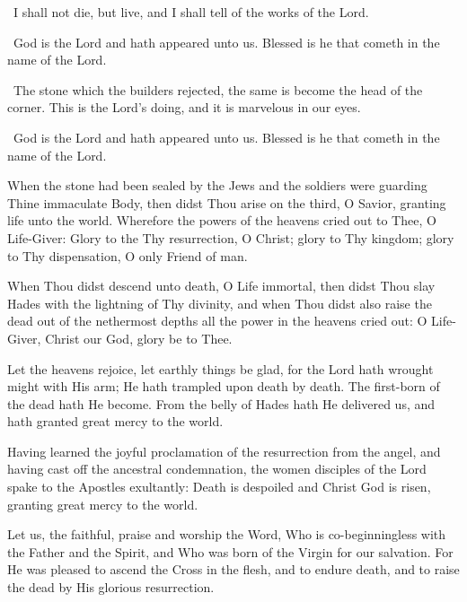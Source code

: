 \documentclass[
  14pt,
  letterpaper,
  openright,
  twocolumn,
  twoside]{memoir}
\begin{document}
\stikh\ I shall not die, but live, and I shall tell of the works of the Lord.

\choir\ God is the Lord and hath appeared unto us. Blessed is he that cometh in the name of the Lord.

\stikh\ The stone which the builders rejected, the same is become the head of the corner. This is the Lord’s doing, and it is marvelous in our eyes.

\choir\ God is the Lord and hath appeared unto us. Blessed is he that cometh in the name of the Lord.



 When the stone had been sealed by the Jews and the soldiers were guarding Thine immaculate Body, then didst Thou arise on the third, O Savior, granting life unto the world. Wherefore the powers of the heavens cried out to Thee, O Life-Giver: Glory to the Thy resurrection, O Christ; glory to Thy kingdom; glory to Thy dispensation, O only Friend of man.

 When Thou didst descend unto death, O Life immortal, then didst Thou slay Hades with the lightning of Thy divinity, and when Thou didst also raise the dead out of the nethermost depths all the power in the heavens cried out: O Life-Giver, Christ our God, glory be to Thee.

 Let the heavens rejoice, let earthly things be glad, for the Lord hath wrought might with His arm; He hath trampled upon death by death. The first-born of the dead hath He become. From the belly of Hades hath He delivered us, and hath granted great mercy to the world.

 Having learned the joyful proclamation of the resurrection from the angel, and having cast off the ancestral condemnation, the women disciples of the Lord spake to the Apostles exultantly: Death is despoiled and Christ God is risen, granting great mercy to the world.

 Let us, the faithful, praise and worship the Word, Who is co-beginningless with the Father and the Spirit, and Who was born of the Virgin for our salvation. For He was pleased to ascend the Cross in the flesh, and to endure death, and to raise the dead by His glorious resurrection.
\end{document}
